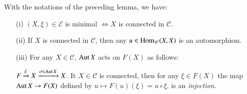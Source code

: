 With the notations of the preceding lemma, we have:

\setcounter{sublemma}{5}
\begin{sublemma}\label{chap4-lem4.4.1.6}
\begin{itemize}
\item[\rm(i)] $(X,\xi)\in\mathscr{E}$ is minimal $\Leftrightarrow X$ is
  connected in $\mathscr{C}$.

\item[\rm(ii)] If $X$ is connected in $\mathscr{C}$, then any $u\in
  \operatorname{Hom}_{\mathscr{C}}(X,X)$ is an automorphism.

\item[\rm(iii)] For any $X\in\mathscr{C}$, $\operatorname{Aut} X$ acts on $F(X)$ as
  follows:

$F\xrightarrow{\xi}X\xrightarrow{\sigma \in \operatorname{Aut} X}X$. It
  $X\in\mathscr{C}$ is connected, then for any $\xi \in F(X)$ the map
  $\operatorname{Aut} X\to F(X)$ defined by $u\mapsto F(u)(\xi)=u\circ \xi$, is an
  {\em injection}.
\end{itemize}
\end{sublemma}

